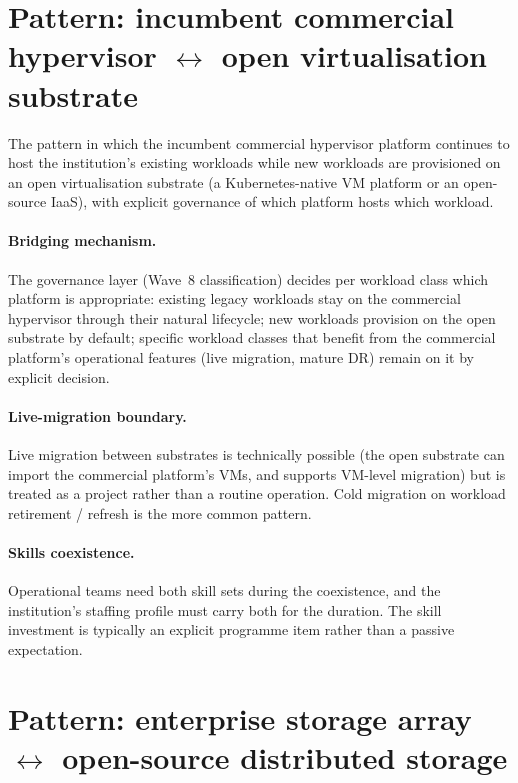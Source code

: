 \section{Pattern: incumbent commercial hypervisor \texorpdfstring{$\leftrightarrow$}{<->} open virtualisation substrate}
\label{sec:cp-vmware-k8s}

The pattern in which the incumbent commercial hypervisor platform
continues to host the institution's existing workloads while new
workloads are provisioned on an open virtualisation substrate
(a Kubernetes-native VM platform or an open-source IaaS), with
explicit governance of which platform hosts which workload.

\paragraph{Bridging mechanism.} The governance layer (Wave~8
classification) decides per workload class which platform is
appropriate: existing legacy workloads stay on the commercial
hypervisor through their natural lifecycle; new workloads provision
on the open substrate by default; specific workload classes that
benefit from the commercial platform's operational features (live
migration, mature DR) remain on it by explicit decision.

\paragraph{Live-migration boundary.} Live migration between
substrates is technically possible (the open substrate can import
the commercial platform's VMs, and supports VM-level migration) but
is treated as a project rather than a routine operation. Cold
migration on workload retirement / refresh is the more common
pattern.

\paragraph{Skills coexistence.} Operational teams need both
skill sets during the coexistence, and the institution's staffing
profile must carry both for the duration. The skill investment is
typically an explicit programme item rather than a passive
expectation.

\section{Pattern: enterprise storage array \texorpdfstring{$\leftrightarrow$}{<->} open-source distributed storage}
\label{sec:cp-netapp-ceph}

